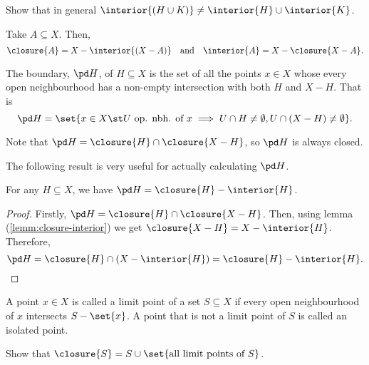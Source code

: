 \begin{exercise}
  Show that in general $\interior{(H \cup K)} \neq \interior{H} \cup \interior{K}$.
\end{exercise}

\begin{nlemma}\label{lemm:closure-interior}
  Take $A \subseteq X$. Then,
  \begin{equation*}
    \closure{A} = X-\interior{(X-A)}
    \quad\text{and}\quad
    \interior{A} = X-\closure{X-A}.
  \end{equation*}
\end{nlemma}

\begin{ndfn}
  The boundary, $\pd H$, of $H \subseteq X$ is the set of all the points $x \in X$ whose every open neighbourhood has a non-empty intersection with both $H$ and $X-H$. That is
  \begin{equation*}
  \pd H = \set{x \in X \st U \text{ op. nbh. of }x \implies U \cap H \neq \emptyset, U \cap (X-H) \neq \emptyset}.
  \end{equation*}
\end{ndfn}

Note that $\pd H = \closure{H} \cap \closure{X-H}$, so $\pd H$ is always closed.

The following result is very useful for actually calculating $\pd H$.
\begin{nlemma}
  For any $H \subseteq X$, we have $\pd H = \closure{H} - \interior{H}$.
\end{nlemma}
\begin{proof}
  Firstly, $\pd H = \closure{H} \cap \closure{X-H}$. Then, using lemma (\ref{lemm:closure-interior}) we get $\closure{X-H} = X - \interior{H}$. Therefore,
  \begin{equation*}
  \pd H = \closure{H} \cap (X-\interior{H}) = \closure{H}-\interior{H}.
  \end{equation*}
\end{proof}

\begin{ndfn}
  A point $x \in X$ is called a limit point of a set $S \subseteq X$ if every open neighbourhood of $x$ intersects $S-\set{x}$. A point that is not a limit point of $S$ is called an isolated point.
\end{ndfn}

\begin{exercise}
  Show that $\closure{S} = S \cup \set{\text{all limit points of }S}$.
\end{exercise}


